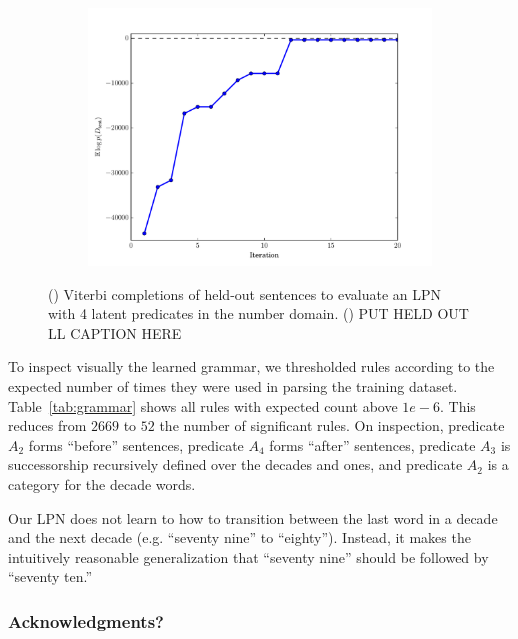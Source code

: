 \documentclass{article} %
\begin{document}
\begin{figure}
\begin{subfigure}[b]{0.45\linewidth}
\begin{tabular}{>{\footnotesize} l >{\footnotesize} l}
      \end{tabular}
      \caption{}
      \label{tab:results}
  \end{subfigure}
  \hfill
  \begin{subfigure}[b]{0.45\linewidth}
    \includegraphics[width=\linewidth]{figures/train_number_net_0006_held_out.pdf}
    \caption{}
    \label{fig:heldoutLL}
  \end{subfigure}
  \caption{() Viterbi completions of held-out sentences to evaluate an LPN with 4 latent predicates in the number domain. () PUT HELD OUT LL CAPTION HERE}
\end{figure}

To inspect visually the learned grammar, we thresholded rules
according to the expected number of times they were used in parsing
the training dataset. Table~\ref{tab:grammar} shows all rules with
expected count above $1e-6$. This reduces from $2669$ to $52$ the
number of significant rules. On inspection, predicate $A_2$ forms
``before'' sentences, predicate $A_4$ forms ``after'' sentences,
predicate $A_3$ is successorship recursively defined over the decades
and ones, and predicate $A_2$ is a category for the decade words.

Our LPN does not learn to how to transition between the last word in a decade
and the next decade (e.g. ``seventy nine'' to ``eighty''). Instead, it
makes the intuitively reasonable generalization that ``seventy nine''
should be followed by ``seventy ten.'' 

\subsubsection*{Acknowledgments?}



\end{document}
